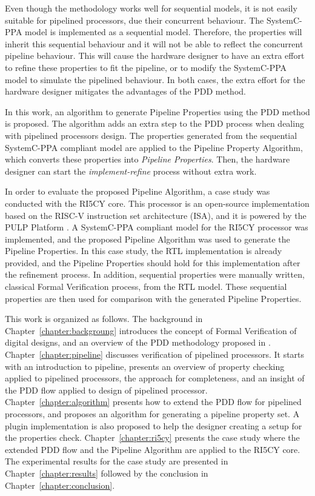 Even though the methodology works well for sequential models, it is not easily suitable for pipelined processors, due their concurrent behaviour. The SystemC-PPA model is implemented as a sequential model. Therefore, the properties will inherit this sequential behaviour and it will not be able to reflect the concurrent pipeline behaviour. This will cause the hardware designer to have an extra effort to refine these properties to fit the pipeline, or to modify the SystemC-PPA model to simulate the pipelined behaviour. In both cases, the extra effort for the hardware designer mitigates the advantages of the PDD method.

In this work, an algorithm to generate Pipeline Properties using the PDD method is proposed. The algorithm adds an extra step to the PDD process when dealing with pipelined processors design. The properties generated from the sequential SystemC-PPA compliant model are applied to the Pipeline Property Algorithm, which converts these properties into \textit{Pipeline Properties}. Then, the hardware designer can start the \textit{implement-refine} process without extra work.

In order to evaluate the proposed Pipeline Algorithm, a case study was conducted with the RI5CY core. This processor is an open-source implementation based on the RISC-V instruction set architecture (ISA), and it is powered by the PULP Platform \cite{pulp}. A SystemC-PPA compliant model for the RI5CY processor was implemented, and the proposed Pipeline Algorithm was used to generate the Pipeline Properties. In this case study, the RTL implementation is already provided, and the Pipeline Properties should hold for this implementation after the refinement process. In addition, sequential properties were manually written, classical Formal Verification process, from the RTL model. These sequential properties are then used for comparison with the generated Pipeline Properties.

This work is organized as follows. The background in Chapter~\ref{chapter:backgroung} introduces the concept of Formal Verification of digital designs, and an overview of the PDD methodology proposed in \cite{paper-pdd}. Chapter~\ref{chapter:pipeline} discusses verification of pipelined processors. It starts with an introduction to pipeline, presents an overview of property checking applied to pipelined processors, the \SSQED{}\cite{paper-symbolic} approach for completeness, and an insight of the PDD flow applied to design of pipelined processor. Chapter~\ref{chapter:algorithm} presents how to extend the PDD flow for pipelined processors, and proposes an algorithm for generating a pipeline property set. A plugin implementation is also proposed to help the designer creating a setup for the \SSQED{} properties check. Chapter~\ref{chapter:ri5cy} presents the case study where the extended PDD flow and the Pipeline Algorithm are applied to the RI5CY core. The experimental results for the case study are presented in Chapter~\ref{chapter:results} followed by the conclusion in Chapter~\ref{chapter:conclusion}.




